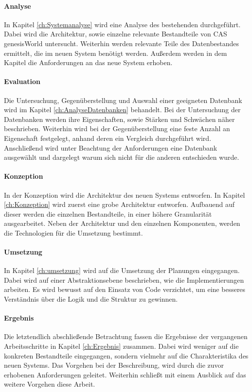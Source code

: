 \paragraph{Analyse} In Kapitel \ref{ch:Systemanalyse} wird eine Analyse des bestehenden durchgeführt. Dabei wird die Architektur, sowie einzelne relevante Bestandteile von CAS genesisWorld untersucht. Weiterhin werden relevante Teile des Datenbestandes ermittelt, die im neuen System benötigt werden. Außerdem werden in dem Kapitel die Anforderungen an das neue System erhoben.

\paragraph{Evaluation} Die Untersuchung, Gegenüberstellung und Auswahl einer geeigneten Datenbank wird im Kapitel \ref{ch:AnalyseDatenbanken} behandelt. Bei der Untersuchung der Datenbanken werden ihre Eigenschaften, sowie Stärken und Schwächen näher beschrieben. Weiterhin wird bei der Gegenüberstellung eine feste Anzahl an Eigenschaft festgelegt, anhand deren ein Vergleich durchgeführt wird. Anschließend wird unter Beachtung der Anforderungen eine Datenbank ausgewählt und dargelegt warum sich nicht für die anderen entschieden wurde.  

\paragraph{Konzeption} In der Konzeption wird die Architektur des neuen Systems entworfen. In Kapitel \ref{ch:Konzeption} wird zuerst eine grobe Architektur entworfen. Aufbauend auf dieser werden die einzelnen Bestandteile, in einer höhere Granularität ausgearbeitet. Neben der Architektur und den einzelnen Komponenten, werden die Technologien für die Umsetzung bestimmt. 

\paragraph{Umsetzung} In Kapitel \ref{ch:umsetzung} wird auf die Umsetzung der Planungen eingegangen. Dabei wird auf einer Abstraktionsebene beschrieben, wie die Implementierungen arbeiten. Es wird bewusst auf den Einsatz von Code verzichtet, um eine besseres Verständnis über die Logik und die Struktur zu gewinnen. 

\paragraph{Ergebnis} Die letztendlich abschließende Betrachtung fassen die Ergebnisse der vergangenen Arbeitsschritte in Kapitel \ref{ch:Ergebnis} zusammen. Dabei wird weniger auf die konkreten Bestandteile eingegangen, sondern vielmehr auf die Charakteristika des neuen Systems. Das Vorgehen bei der Beschreibung, wird durch die zuvor erhobenen Anforderungen geleitet. Weiterhin schließt mit einem Ausblick auf das weitere Vorgehen diese Arbeit. 

